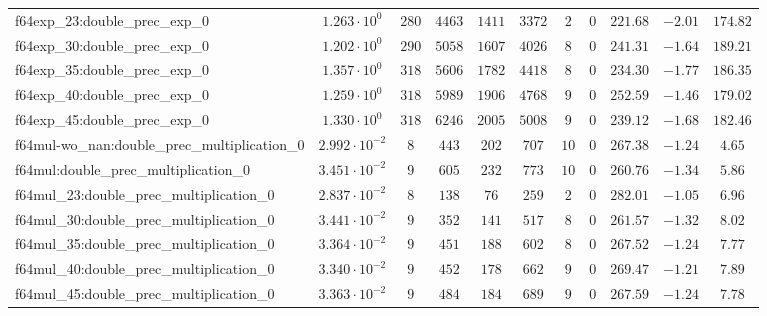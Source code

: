 \begin{tabular}{|l|c|c|c|c|c|c|c|c|c|c|}
f64exp\_23:double\_prec\_exp\_0                & $ 1.263 \cdot 10^{0}  $ & $ 280    $ & $ 4463   $ & $ 1411  $ & $ 3372   $ & $ 2   $ & $ 0 $ & $ 221.68      $ & $ -2.01   $ & $ 174.82  $ \\
f64exp\_30:double\_prec\_exp\_0                & $ 1.202 \cdot 10^{0}  $ & $ 290    $ & $ 5058   $ & $ 1607  $ & $ 4026   $ & $ 8   $ & $ 0 $ & $ 241.31      $ & $ -1.64   $ & $ 189.21  $ \\
f64exp\_35:double\_prec\_exp\_0                & $ 1.357 \cdot 10^{0}  $ & $ 318    $ & $ 5606   $ & $ 1782  $ & $ 4418   $ & $ 8   $ & $ 0 $ & $ 234.30      $ & $ -1.77   $ & $ 186.35  $ \\
f64exp\_40:double\_prec\_exp\_0                & $ 1.259 \cdot 10^{0}  $ & $ 318    $ & $ 5989   $ & $ 1906  $ & $ 4768   $ & $ 9   $ & $ 0 $ & $ 252.59      $ & $ -1.46   $ & $ 179.02  $ \\
f64exp\_45:double\_prec\_exp\_0                & $ 1.330 \cdot 10^{0}  $ & $ 318    $ & $ 6246   $ & $ 2005  $ & $ 5008   $ & $ 9   $ & $ 0 $ & $ 239.12      $ & $ -1.68   $ & $ 182.46  $ \\
f64mul-wo\_nan:double\_prec\_multiplication\_0 & $ 2.992 \cdot 10^{-2} $ & $ 8      $ & $ 443    $ & $ 202   $ & $ 707    $ & $ 10  $ & $ 0 $ & $ 267.38      $ & $ -1.24   $ & $ 4.65    $ \\
f64mul:double\_prec\_multiplication\_0         & $ 3.451 \cdot 10^{-2} $ & $ 9      $ & $ 605    $ & $ 232   $ & $ 773    $ & $ 10  $ & $ 0 $ & $ 260.76      $ & $ -1.34   $ & $ 5.86    $ \\
f64mul\_23:double\_prec\_multiplication\_0     & $ 2.837 \cdot 10^{-2} $ & $ 8      $ & $ 138    $ & $ 76    $ & $ 259    $ & $ 2   $ & $ 0 $ & $ 282.01      $ & $ -1.05   $ & $ 6.96    $ \\
f64mul\_30:double\_prec\_multiplication\_0     & $ 3.441 \cdot 10^{-2} $ & $ 9      $ & $ 352    $ & $ 141   $ & $ 517    $ & $ 8   $ & $ 0 $ & $ 261.57      $ & $ -1.32   $ & $ 8.02    $ \\
f64mul\_35:double\_prec\_multiplication\_0     & $ 3.364 \cdot 10^{-2} $ & $ 9      $ & $ 451    $ & $ 188   $ & $ 602    $ & $ 8   $ & $ 0 $ & $ 267.52      $ & $ -1.24   $ & $ 7.77    $ \\
f64mul\_40:double\_prec\_multiplication\_0     & $ 3.340 \cdot 10^{-2} $ & $ 9      $ & $ 452    $ & $ 178   $ & $ 662    $ & $ 9   $ & $ 0 $ & $ 269.47      $ & $ -1.21   $ & $ 7.89    $ \\
f64mul\_45:double\_prec\_multiplication\_0     & $ 3.363 \cdot 10^{-2} $ & $ 9      $ & $ 484    $ & $ 184   $ & $ 689    $ & $ 9   $ & $ 0 $ & $ 267.59      $ & $ -1.24   $ & $ 7.78    $ \\

\end{tabular}
